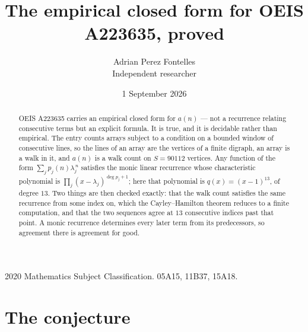 \documentclass[11pt,a4paper]{article}
\title{The empirical closed form for OEIS A223635, proved}
\author{Adrian Perez Fontelles\\ \small Independent researcher}
\date{1 September 2026}
\theoremstyle{plain}
\theoremstyle{definition}
\begin{document}
\maketitle

\begin{abstract}
OEIS A223635 carries an empirical closed form for $a(n)$ --- not a recurrence relating
consecutive terms but an explicit formula. It is true, and it is decidable rather than
empirical. The entry counts arrays subject to a condition on a bounded window of consecutive lines, so the lines of an array are the
vertices of a finite digraph, an array is a walk in it, and $a(n)$ is a walk count on
$S=90112$ vertices. Any function of the form $\sum_j p_j(n)\lambda_j^{\,n}$ satisfies the
monic linear recurrence whose characteristic polynomial is
$\prod_j(x-\lambda_j)^{\deg p_j+1}$; here that polynomial is $q(x)=(x-1)^{13}$, of degree
$13$. Two things are then checked exactly: that the walk count satisfies the same
recurrence from some index on, which the Cayley--Hamilton theorem reduces to a finite
computation, and that the two sequences agree at $13$ consecutive indices past that
point. A monic recurrence determines every later term from its predecessors, so agreement
there is agreement for good.
\end{abstract}

\noindent\small 2020 Mathematics Subject Classification. 05A15, 11B37, 15A18.\normalsize

\section{The conjecture}
\end{document}
